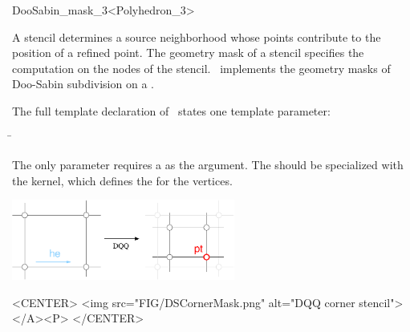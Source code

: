 \begin{ccRefClass}{DooSabin_mask_3<Polyhedron_3>}

\ccDefinition

A stencil determines a source neighborhood 
whose points contribute to the position of a refined point.
The geometry mask of a stencil specifies
the computation on the nodes of the stencil.
\ccClassTemplateName\ implements the geometry masks of 
Doo-Sabin subdivision on a .


\ccParameters

The full template declaration of \ccClassTemplateName\ states one
template parameter:

\begin{tabbing}
 \= 
\end{tabbing}
   
The only parameter requires a  as the argument. The
 should be specialized with the 
kernel, which defines the  for the vertices.

\ccCreation
{}


\ccThreeToTwo


\begin{ccTexOnly}
  \begin{center}
    \parbox{0.55\textwidth}{%
      \includegraphics[width=0.55\textwidth]{Subdivision_method_3_ref/FIG/DSCornerMask}%
    }
  \end{center}
\end{ccTexOnly}

\begin{ccHtmlOnly}
    <CENTER>
      <img src="FIG/DSCornerMask.png" alt="DQQ corner stencil"></A><P>
    </CENTER>
\end{ccHtmlOnly}

\ccSeeAlso

\\

\end{ccRefClass}

